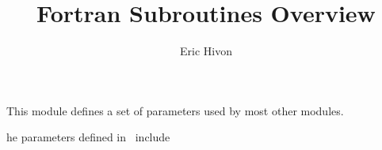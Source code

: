 
\sloppy


\title{\healpix Fortran Subroutines Overview}
 \section[healpix\_types module]{ }
\label{sub:healpix_types}
\author{Eric Hivon}

\begin{facility}
{This module defines a set of parameters used by most other
\healpix modules.}
{\modHealpixTypes}
\end{facility}


\newenvironment{mytable}[1]{%
\begin{minipage}[b]{\linewidth}{%
\renewcommand{\thefootnote}{\fnsymbol{footnote}}
\renewcommand{\footnoterule}{}
{#1}
}%
\end{minipage}
}

The parameters defined in \thedocid\ include


